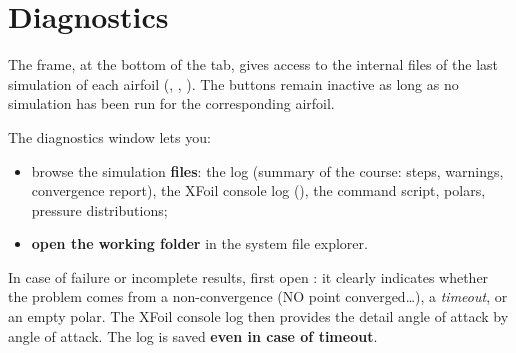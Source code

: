 \section{Diagnostics}
\label{sec:diagnostic}

The  frame, at the bottom of the tab, gives access
to the internal files of the last simulation of each airfoil
(, , ). The
buttons remain inactive as long as no simulation has been run
for the corresponding airfoil.


The diagnostics window lets you:

\begin{itemize}
    \item browse the simulation \textbf{files}: the
         log (summary of the course: steps,
        warnings, convergence report), the XFoil console log
        (), the command script,
        polars, pressure distributions;
    \item \textbf{open the working folder} in the system file
        explorer.
\end{itemize}

\begin{astuce}
In case of failure or incomplete results, first open
: it clearly indicates whether the problem
comes from a non-convergence (\og NO point converged\dots\fg{}),
a \emph{timeout}, or an empty polar. The XFoil console log
then provides the detail angle of attack by angle of attack. The log is
saved \textbf{even in case of timeout}.
\end{astuce}

